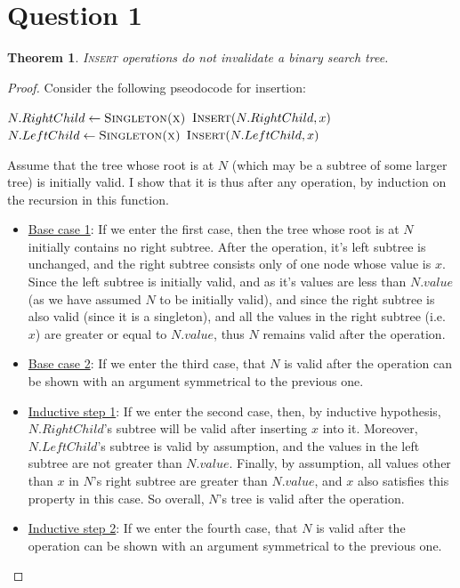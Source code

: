 \documentclass[a4paper,11pt]{scrartcl}
\newtheorem{theorem}{Theorem}
\begin{document}
\section*{Question 1}
\begin{theorem}
    \textsc{Insert} operations do not invalidate a binary search tree.
\end{theorem}
\begin{proof}
Consider the following pseodocode for insertion:

\begin{algorithmic}[1]
    \State $N.RightChild \gets \textsc{Singleton(x)}$
    \State $\textsc{Insert}(N.RightChild, x)$
    \State $N.LeftChild \gets \textsc{Singleton(x)}$
    \State $\textsc{Insert}(N.LeftChild, x)$
\EndIf
\EndFunction
\end{algorithmic}

Assume that the tree whose root is at $N$ (which may be a subtree of some larger tree) is initially valid. I show that it is thus after any operation, by induction on the recursion in this function.

\begin{itemize}
\item \underline{Base case 1}: If we enter the first case, then the tree whose root is at $N$ initially contains no right subtree. After the operation, it's left subtree is unchanged, and the right subtree consists only of one node whose value is $x$. Since the left subtree is initially valid, and as it's values are less than $N.value$ (as we have assumed $N$ to be initially valid), and since the right subtree is also valid (since it is a singleton), and all the values in the right subtree (i.e. $x$) are greater or equal to $N.value$, thus $N$ remains valid after the operation.
\item \underline{Base case 2}: If we enter the third case, that $N$ is valid after the operation can be shown with an argument symmetrical to the previous one.
\item \underline{Inductive step 1}: If we enter the second case, then, by inductive hypothesis, $N.RightChild$'s subtree will be valid after inserting $x$ into it. Moreover, $N.LeftChild$'s subtree is valid by assumption, and the values in the left subtree are not greater than $N.value$. Finally, by assumption, all values other than $x$ in $N$'s right subtree are greater than $N.value$, and $x$ also satisfies this property in this case. So overall, $N$'s tree is valid after the operation.
\item \underline{Inductive step 2}: If we enter the fourth case, that $N$ is valid after the operation can be shown with an argument symmetrical to the previous one.
\end{itemize}
\end{proof}
\end{document}
